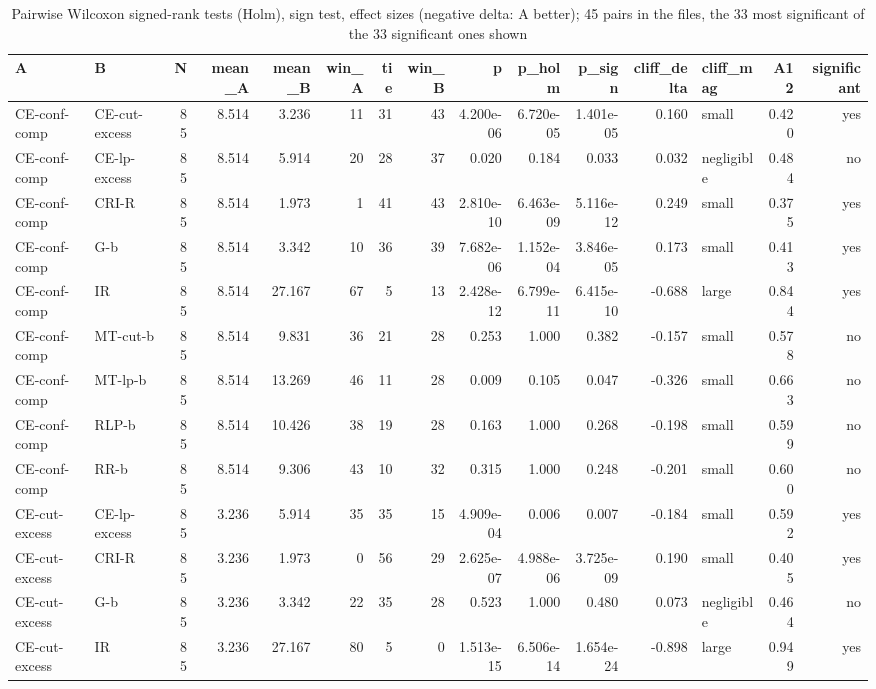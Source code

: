 \begin{table}[htbp]
\centering
\small
\caption{Pairwise Wilcoxon signed-rank tests (Holm), sign test, effect sizes (negative delta: A better); 45 pairs in the files, the 33 most significant of the 33 significant ones shown}
\label{tab:E2b_head_to_head_budgets_b10_pairwise}
\begin{tabular}{llrrrrrrrrrrlrr}
\toprule
A & B & N & mean\_A & mean\_B & win\_A & tie & win\_B & p & p\_holm & p\_sign & cliff\_delta & cliff\_mag & A12 & significant \\
\midrule
CE-conf-comp & CE-cut-excess & 85 & 8.514 & 3.236 & 11 & 31 & 43 & 4.200e-06 & 6.720e-05 & 1.401e-05 & 0.160 & small & 0.420 & yes \\
CE-conf-comp & CE-lp-excess & 85 & 8.514 & 5.914 & 20 & 28 & 37 & 0.020 & 0.184 & 0.033 & 0.032 & negligible & 0.484 & no \\
CE-conf-comp & CRI-R & 85 & 8.514 & 1.973 & 1 & 41 & 43 & 2.810e-10 & 6.463e-09 & 5.116e-12 & 0.249 & small & 0.375 & yes \\
CE-conf-comp & G-b & 85 & 8.514 & 3.342 & 10 & 36 & 39 & 7.682e-06 & 1.152e-04 & 3.846e-05 & 0.173 & small & 0.413 & yes \\
CE-conf-comp & IR & 85 & 8.514 & 27.167 & 67 & 5 & 13 & 2.428e-12 & 6.799e-11 & 6.415e-10 & -0.688 & large & 0.844 & yes \\
CE-conf-comp & MT-cut-b & 85 & 8.514 & 9.831 & 36 & 21 & 28 & 0.253 & 1.000 & 0.382 & -0.157 & small & 0.578 & no \\
CE-conf-comp & MT-lp-b & 85 & 8.514 & 13.269 & 46 & 11 & 28 & 0.009 & 0.105 & 0.047 & -0.326 & small & 0.663 & no \\
CE-conf-comp & RLP-b & 85 & 8.514 & 10.426 & 38 & 19 & 28 & 0.163 & 1.000 & 0.268 & -0.198 & small & 0.599 & no \\
CE-conf-comp & RR-b & 85 & 8.514 & 9.306 & 43 & 10 & 32 & 0.315 & 1.000 & 0.248 & -0.201 & small & 0.600 & no \\
CE-cut-excess & CE-lp-excess & 85 & 3.236 & 5.914 & 35 & 35 & 15 & 4.909e-04 & 0.006 & 0.007 & -0.184 & small & 0.592 & yes \\
CE-cut-excess & CRI-R & 85 & 3.236 & 1.973 & 0 & 56 & 29 & 2.625e-07 & 4.988e-06 & 3.725e-09 & 0.190 & small & 0.405 & yes \\
CE-cut-excess & G-b & 85 & 3.236 & 3.342 & 22 & 35 & 28 & 0.523 & 1.000 & 0.480 & 0.073 & negligible & 0.464 & no \\
CE-cut-excess & IR & 85 & 3.236 & 27.167 & 80 & 5 & 0 & 1.513e-15 & 6.506e-14 & 1.654e-24 & -0.898 & large & 0.949 & yes \\

\end{tabular}
\end{table}
